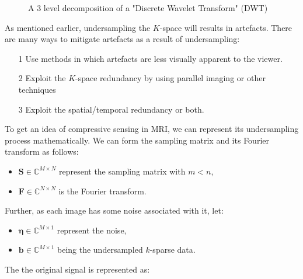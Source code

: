 \documentclass[titlepage,oneside, 12pt]{book}
\theoremstyle{break}
\begin{document}
\begin{figure}[h]
\begin{center}

\caption{A 3 level decomposition  of a "Discrete Wavelet Transform" (DWT) }
\label{fig:3d}
\end{center}
\end{figure}



\newpage
As mentioned earlier, undersampling the $K$-space will results in artefacts. There are many ways to mitigate artefacts as a result of undersampling: 
\begin{itemize}
\item[1] Use methods in which artefacts are less visually apparent to the viewer. 
\item[2] Exploit the $K$-space redundancy by using parallel imaging or other techniques
\item[3] Exploit the spatial/temporal redundancy or both\cite{sparseMRI}.
\end{itemize}

To get an idea of compressive sensing in MRI, we can represent its undersampling process mathematically. We can form the sampling matrix and its Fourier transform as follows:
\begin{itemize}
\item $\textbf{S} \in \mathbb{C}^{M \times N}$ represent the sampling matrix with $m < n $,

\item $\textbf{F} \in \mathbb{C}^{N \times N}$ is the Fourier transform.
\end{itemize}
Further, as each image has some noise associated with it, let:
\begin{itemize}
\item $\pmb{\eta} \in \mathbb{C}^{M \times 1}$ represent the noise,

\item $\textbf{b} \in \mathbb{C}^{M \times 1}$ being the undersampled $k$-sparse data. 
\end{itemize}
The the original signal is represented as:
\end{document}
